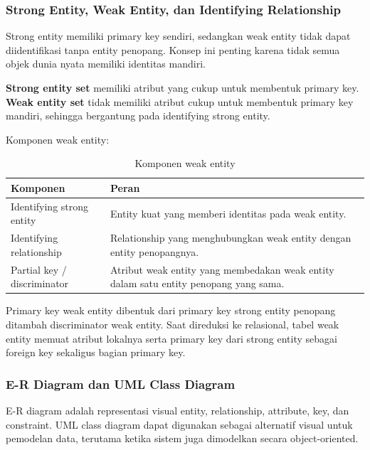 \subsubsection{Strong Entity, Weak Entity, dan Identifying Relationship}

\begin{jawab}
Strong entity memiliki primary key sendiri, sedangkan weak entity tidak dapat diidentifikasi tanpa entity penopang. Konsep ini penting karena tidak semua objek dunia nyata memiliki identitas mandiri.
\end{jawab}

\textbf{Strong entity set} memiliki atribut yang cukup untuk membentuk primary key. \textbf{Weak entity set} tidak memiliki atribut cukup untuk membentuk primary key mandiri, sehingga bergantung pada identifying strong entity.

Komponen weak entity:
\begin{table}[H]
\centering
\begin{tabularx}{\textwidth}{|L{0.30\textwidth}|X|}
\hline
\textbf{Komponen} & \textbf{Peran} \\
\hline
Identifying strong entity & Entity kuat yang memberi identitas pada weak entity. \\
\hline
Identifying relationship & Relationship yang menghubungkan weak entity dengan entity penopangnya. \\
\hline
Partial key / discriminator & Atribut weak entity yang membedakan weak entity dalam satu entity penopang yang sama. \\
\hline
\end{tabularx}
\caption{Komponen weak entity}
\label{tab:weak-entity}
\end{table}

Primary key weak entity dibentuk dari primary key strong entity penopang ditambah discriminator weak entity. Saat direduksi ke relasional, tabel weak entity memuat atribut lokalnya serta primary key dari strong entity sebagai foreign key sekaligus bagian primary key.

\subsubsection{E-R Diagram dan UML Class Diagram}

\begin{jawab}
E-R diagram adalah representasi visual entity, relationship, attribute, key, dan constraint. UML class diagram dapat digunakan sebagai alternatif visual untuk pemodelan data, terutama ketika sistem juga dimodelkan secara object-oriented.
\end{jawab}

